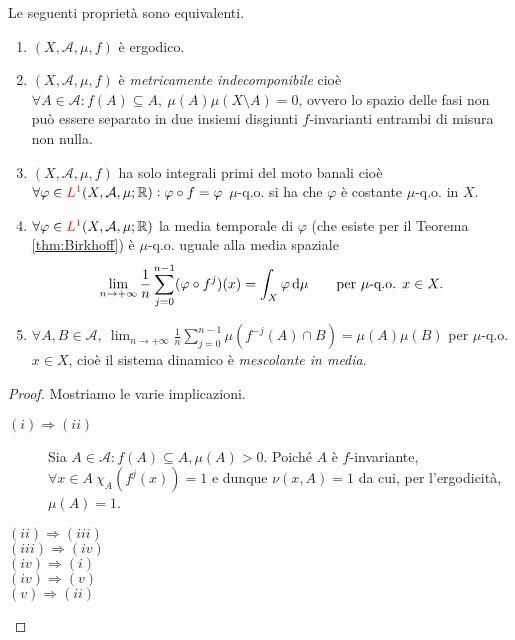 \begin{thm}
    Le seguenti proprietà sono equivalenti.
    \begin{enumerate}[label=(\roman*)]
        \item $ (X, \mathcal{A}, \mu, f) $ è ergodico.
        \item $ (X, \mathcal{A}, \mu, f) $ è \emph{metricamente indecomponibile} cioè $ \forall A \in \mathcal{A} : f(A) \subseteq A, \ \mu(A) \mu(X \setminus A) = 0 $, ovvero lo spazio delle fasi non può essere separato in due insiemi disgiunti $ f $-invarianti entrambi di misura non nulla.
        \item $ (X, \mathcal{A}, \mu, f) $ ha solo integrali primi del moto banali cioè $ \forall \varphi \in \textcolor{red}{L^1}(X, \mathcal{A}, \mu; \mathbb{R}) : \varphi \circ f = \varphi $ $ \mu $-q.o. si ha che $ \varphi $ è costante $ \mu $-q.o. in $ X $.
        \item $ \forall \varphi \in \textcolor{red}{L^1}(X, \mathcal{A}, \mu; \mathbb{R}) $ la media temporale di $ \varphi $ (che esiste per il Teorema \ref{thm:Birkhoff}) è $ \mu $-q.o. uguale alla media spaziale
        \[
            \lim_{n \to +\infty} \frac{1}{n} \sum_{j=0}^{n-1} (\varphi \circ f^j)(x) = \int_{X} \varphi \dif{\mu} \qquad \text{per } \mu\text{-q.o. } x \in X.
        \]
        \item $ \forall A, B \in \mathcal{A}, \ \displaystyle{\lim_{n \to +\infty} \frac{1}{n} \sum_{j=0}^{n-1} \mu(f^{-j}(A) \cap B) = \mu(A) \mu(B)} $ per $ \mu $-q.o. $ x \in X $, cioè il sistema dinamico è \emph{mescolante in media}.
    \end{enumerate}
\end{thm}
\begin{proof}
    Mostriamo le varie implicazioni.
    \begin{description}
        \item[$ (i) \Rightarrow (ii) $] Sia $ A\in\mathcal{A} : f(A) \subseteq A, \mu(A) > 0 $. Poiché $ A $ è $ f $-invariante, $ \forall x\in A\ \chi_A(f^j(x)) = 1 $ e dunque $ \nu(x,A) = 1 $ da cui, per l'ergodicità, $ \mu(A) = 1 $.
        \item[$ (ii) \Rightarrow (iii) $] 
        \item[$ (iii) \Rightarrow (iv) $] 
        \item[$ (iv) \Rightarrow (i) $] 
        \item[$ (iv) \Rightarrow (v) $] 
        \item[$ (v) \Rightarrow (ii) $] 
    \end{description}
\end{proof}


